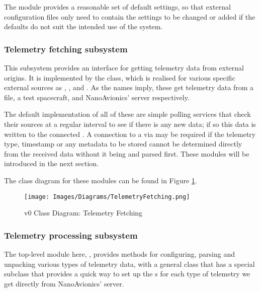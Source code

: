 The  module provides a reasonable set of default settings, so that external configuration files only need to contain the settings to be changed or added if the defaults do not suit the intended use of the system.

\subsubsection{Telemetry fetching subsystem}
This subsystem provides an interface for getting telemetry data from external origins. It is implemented by the  class, which is realised for various specific external sources as , , and . As the names imply, these get telemetry data from a file, a test spacecraft, and NanoAvionics’ server respectively.

The default implementation of all of these are simple polling services that check their sources at a regular interval to see if there is any new data; if so this data is written to the connected . A connection to a  via  may be required if the telemetry type, timestamp or any \gls{metadata} to be stored cannot be determined directly from the received data without it being  and parsed first. These modules will be introduced in the next section.

The class diagram for these modules can be found in Figure \ref{fig:cdfetching}.

\begin{figure}[H]
  \centering
  \texttt{[image: Images/Diagrams/TelemetryFetching.png]}
  \caption{v0 Class Diagram: Telemetry Fetching}
  \label{fig:cdfetching}
\end{figure}

\subsubsection{Telemetry processing subsystem}
The top-level module here, , provides methods for configuring, parsing and \gls{unpacking} various types of telemetry data, with a general class  that has a special subclass  that provides a quick way to set up the s for each type of telemetry we get directly from NanoAvionics’ server.

